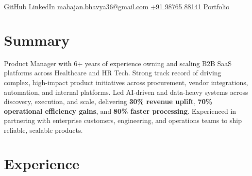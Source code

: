\documentclass[]{plushcv}
\begin{document}
\linespread{0.97}



{\contactline
{\href{https://github.com/bhavyaamahajann}{GitHub}}
{\href{https://linkedin.com/in/bhavyaamahajan}{LinkedIn}}
{\href{mailto:mahajan.bhavya36@gmail.com}{mahajan.bhavya36@gmail.com}}
{\href{tel:+919876588141}{+91 98765 88141}}
{\href{https://nextleap.app/portfolio/bhavyamahajan}{Portfolio}}
}

\begin{minipage}[t]{0.70\textwidth}


\section{Summary}
Product Manager with 6+ years of experience owning and scaling B2B SaaS platforms across Healthcare and HR Tech. Strong track record of driving complex, high-impact product initiatives across procurement, vendor integrations, automation, and internal platforms. Led AI-driven and data-heavy systems across discovery, execution, and scale, delivering \textbf{30\% revenue uplift}, \textbf{70\% operational efficiency gains}, and \textbf{80\% faster processing}. Experienced in partnering with enterprise customers, engineering, and operations teams to ship reliable, scalable products.

\sectionsep


\section{Experience}


\end{minipage}
\end{document}
